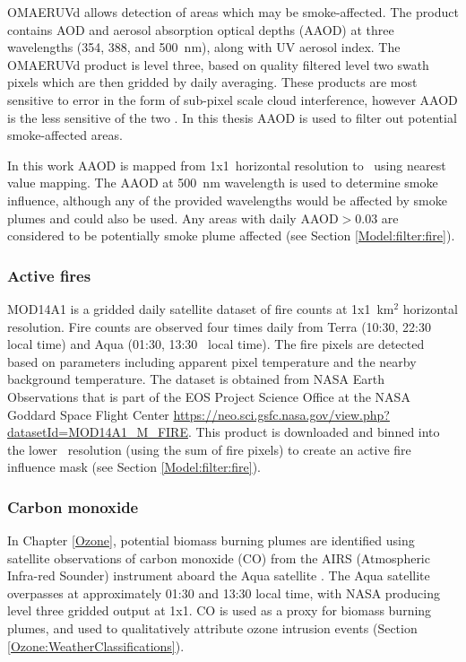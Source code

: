       
      OMAERUVd allows detection of areas which may be smoke-affected.
      The product contains AOD and aerosol absorption optical depths (AAOD) at three wavelengths (354, 388, and 500~nm), along with UV aerosol index.
      The OMAERUVd product is level three, based on quality filtered level two swath pixels which are then gridded by daily averaging.
      These products are most sensitive to error in the form of sub-pixel scale cloud interference, however AAOD is the less sensitive of the two \parencite{Ahn2008}.
      In this thesis AAOD is used to filter out potential smoke-affected areas.
      
      In this work AAOD is mapped from 1\degr x1\degr ~horizontal resolution to \highhr ~using nearest value mapping.
      The AAOD at 500~nm wavelength is used to determine smoke influence, although any of the provided wavelengths would be affected by smoke plumes and could also be used.
      Any areas with daily AAOD$>0.03$ are considered to be potentially smoke plume affected (see Section \ref{Model:filter:fire}).
    
    
    \subsubsection{Active fires}
      \label{Model:datasets:MOD14A1}
      MOD14A1 is a gridded daily satellite dataset of fire counts at 1x1~km$^2$ horizontal resolution.
      Fire counts are observed four times daily from Terra (10:30, 22:30 local time) and Aqua (01:30, 13:30~ local time).
      The fire pixels are detected based on parameters including apparent pixel temperature and the nearby background temperature.
      The dataset is obtained from NASA Earth Observations that is part of the EOS Project Science Office at the NASA Goddard Space Flight Center \url{https://neo.sci.gsfc.nasa.gov/view.php?datasetId=MOD14A1_M_FIRE}.
      This product is downloaded and binned into the lower \highhr ~resolution (using the sum of fire pixels) to create an active fire influence mask (see Section \ref{Model:filter:fire}).
      
    \subsubsection{Carbon monoxide}
      \label{Model:datasets:AIRS}
      
      In Chapter \ref{Ozone}, potential biomass burning plumes are identified using satellite observations of carbon monoxide (CO) from the AIRS (Atmospheric Infra-red Sounder) instrument aboard the Aqua satellite \parencite{AIRS3STD}.
      The Aqua satellite overpasses at approximately 01:30 and 13:30 local time, with NASA producing level three gridded output at 1\degr x1\degr .
      CO is used as a proxy for biomass burning plumes, and used to qualitatively attribute ozone intrusion events (Section \ref{Ozone:WeatherClassifications}).
      

